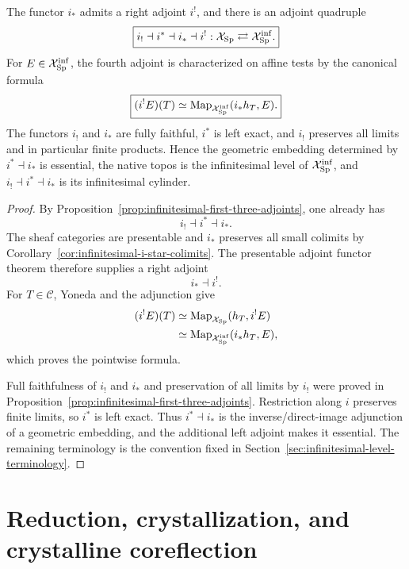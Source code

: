 \begin{theorem}
\label{thm:brave-new-infinitesimal-adjunction}
The functor $i_*$ admits a right adjoint $i^!$, and there is an adjoint
quadruple
\[
    \boxed{
    i_!\dashv i^*\dashv i_*\dashv i^!:
    \mathcal X_{\mathrm{Sp}}
    \rightleftarrows
    \mathcal X_{\mathrm{Sp}}^{\mathrm{inf}}.
    }
\]
For $E\in\mathcal X_{\mathrm{Sp}}^{\mathrm{inf}}$, the fourth adjoint is characterized
on affine tests by the canonical formula
\[
    \boxed{
    (i^!E)(T)
    \simeq
    \operatorname{Map}_{\mathcal X_{\mathrm{Sp}}^{\mathrm{inf}}}(i_*h_T,E).
    }
\]
The functors $i_!$ and $i_*$ are fully faithful, $i^*$ is left exact, and
$i_!$ preserves all limits and in particular finite products.  Hence the geometric embedding determined by $i^*\dashv i_*$ is essential,
the native topos is the infinitesimal level of
$\mathcal X_{\mathrm{Sp}}^{\mathrm{inf}}$, and $i_!\dashv i^*\dashv i_*$ is its
infinitesimal cylinder.
\end{theorem}

\begin{proof}
By Proposition~\ref{prop:infinitesimal-first-three-adjoints}, one already has
\[
    i_!\dashv i^*\dashv i_*.
\]
The sheaf categories are presentable and $i_*$ preserves all small colimits
by Corollary~\ref{cor:infinitesimal-i-star-colimits}.  The presentable adjoint
functor theorem therefore supplies a right adjoint
\[
    i_*\dashv i^!.
\]
For $T\in\mathcal C$, Yoneda and the adjunction give
\[
\begin{aligned}
    (i^!E)(T)
    &\simeq
    \operatorname{Map}_{\mathcal X_{\mathrm{Sp}}}(h_T,i^!E)\\
    &\simeq
    \operatorname{Map}_{\mathcal X_{\mathrm{Sp}}^{\mathrm{inf}}}(i_*h_T,E),
\end{aligned}
\]
which proves the pointwise formula.

Full faithfulness of $i_!$ and $i_*$ and preservation of all limits by $i_!$
were proved in Proposition~\ref{prop:infinitesimal-first-three-adjoints}.
Restriction along $i$ preserves finite limits, so $i^*$ is left exact.  Thus
$i^*\dashv i_*$ is the inverse/direct-image adjunction of a geometric
embedding, and the additional left adjoint makes it essential.  The remaining
terminology is the convention fixed in
Section~\ref{sec:infinitesimal-level-terminology}.
\end{proof}

\section{Reduction, crystallization, and crystalline coreflection}
\label{sec:infinitesimal-modal-triple}

